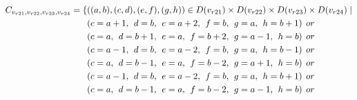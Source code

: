 \begin{align*}
\Const{r21}{r22}{r23}{r24}=\{&((a,b),(c,d),(e,f),(g,h))\in \Domain{r21}\times \Domain{r22}\times\Domain{r23}\times\Domain{r24}\mid\\
&(c = a + 1,\hspace{1ex}d = b,\hspace{1ex}e = a + 2, \hspace{1ex}f = b,\hspace{1ex}g=a,\hspace{1ex}h=b+1)\hspace{1ex} or\\
&(c = a,\hspace{1ex}d = b+1,\hspace{1ex}e = a, \hspace{1ex}f = b+2,\hspace{1ex}g=a-1,\hspace{1ex}h=b)\hspace{1ex} or\\
&(c = a-1,\hspace{1ex}d = b,\hspace{1ex}e = a-2,\hspace{1ex} f = b,\hspace{1ex}g=a,\hspace{1ex}h=b-1)\hspace{1ex} or\\
&(c = a,\hspace{1ex}d = b-1,\hspace{1ex}e = a, \hspace{1ex}f = b-2,\hspace{1ex}g=a+1,\hspace{1ex}h=b)\hspace{1ex} or\\
&(c = a-1,\hspace{1ex}d = b,\hspace{1ex}e = a-2, \hspace{1ex}f = b,\hspace{1ex}g=a,\hspace{1ex}h=b+1)\hspace{1ex} or\\
&(c = a,\hspace{1ex}d = b-1,\hspace{1ex}e = a, \hspace{1ex}f = b-2,\hspace{1ex}g=a-1,\hspace{1ex}h=b)\hspace{1ex} or\\

\end{align*}
